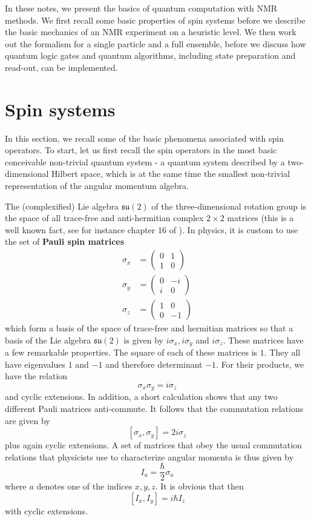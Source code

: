 \documentclass[a4paper, draft]{article}
\theoremstyle{own}
\theoremstyle{remark}
\newcommand{\su}{\mathfrak{su}}
\begin{document}
In these notes, we present the basics of quantum computation with NMR methods. We first recall some basic properties of spin systems before we describe the basic mechanics of an NMR experiment on a heuristic level. We then work out the formalism for a single particle and a full ensemble, before we discuss how quantum logic gates and quantum algorithms, including state preparation and read-out, can be implemented.



\section{Spin systems}

In this section, we recall some of the basic phenomena associated with spin operators. To start, let us first recall the spin operators in the most basic conceivable non-trivial quantum system - a quantum system described by a two-dimensional Hilbert space, which is at the same time the smallest non-trivial representation of the angular momentum algebra.

The (complexified) Lie algebra $\su(2)$ of the three-dimensional rotation group is the space of all trace-free and anti-hermitian complex $2 \times 2$ matrices (this is a well known fact, see for instance chapter 16 of \cite{BrianHall}). In physics, it is custom to use the set of {\bf Pauli spin matrices}
\begin{align}
\sigma_x &= \begin{pmatrix} 0 & 1 \\ 1 & 0 \end{pmatrix} \\
\sigma_y &= \begin{pmatrix} 0 & -i \\ i & 0 \end{pmatrix} \\
\sigma_z &= \begin{pmatrix} 1 & 0 \\ 0 & -1 \end{pmatrix} 
\end{align}
which form a basis of the space of trace-free and hermitian matrices so that a basis of the Lie algebra $\su(2)$ is given by $i \sigma_x, i \sigma_y$ and $i \sigma_z$. These matrices have a few remarkable properties. The square of each of these matrices is $1$. They all have eigenvalues $1$ and $-1$ and therefore determinant $-1$. For their products, we have the relation
$$
\sigma_x \sigma_y = i \sigma_z
$$
and cyclic extensions. In addition, a short calculation shows that any two different Pauli matrices anti-commute. It follows that the commutation relations are given by
$$
[\sigma_x, \sigma_y] = 2 i \sigma_z 
$$
plus again cyclic extensions. A set of matrices that obey the usual commutation relations that physicists use to characterize angular momenta is thus given by
$$
I_a = \frac{\hbar}{2} \sigma_a
$$
where $a$ denotes one of the indices $x, y, z$. It is obvious that then
$$
[I_x, I_y] = i \hbar I_z
$$
with cyclic extensions. 
\end{document}
